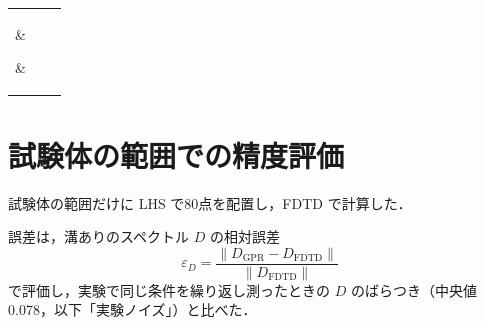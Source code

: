 \documentclass{jarticle}
\begin{document}
%
\begin{center}
 \begin{tabular}{|c|c|c|} \hline
  \parbox{50mm}{\vspace{1mm} } &
  \parbox{55mm}{\vspace{1mm} } &
  \parbox{50mm}{\vspace{1mm} }
  \\ [2mm] \hline
%
  \\ [2mm] \hline\hline
%
  \\ [2mm] \hline
 \end{tabular}
\end{center}
\par



\section{試験体の範囲での精度評価}
試験体の範囲だけに LHS で80点を配置し，FDTD で計算した．

誤差は，溝ありのスペクトル $D$ の相対誤差
\begin{equation}
 \varepsilon_D = \frac{\| D_{\mathrm{GPR}} - D_{\mathrm{FDTD}} \|}{\| D_{\mathrm{FDTD}} \|}
\end{equation}
で評価し，実験で同じ条件を繰り返し測ったときの $D$ のばらつき（中央値 0.078，以下「実験ノイズ」）と比べた．
\end{document}
